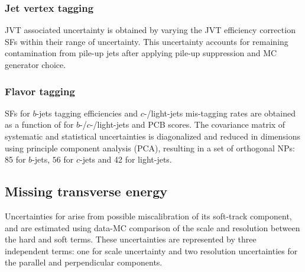 \documentclass[../thesis.tex]{subfiles}
\begin{document}
\subsubsection*{Jet vertex tagging}
JVT associated uncertainty is obtained by varying the JVT efficiency correction SFs within their range of uncertainty. This uncertainty accounts for remaining contamination from pile-up jets after applying pile-up suppression and MC generator choice.

\subsubsection*{Flavor tagging}
SFs for $b$-jets tagging efficiencies and $c$-/light-jets mis-tagging rates are obtained as a function of \pT for $b$-/$c$-/light-jets and PCB scores. The covariance matrix of systematic and statistical uncertainties is diagonalized and reduced in dimensions using principle component analysis (PCA), resulting in a set of orthogonal NPs: 85 for $b$-jets, $56$ for $c$-jets and 42 for light-jets.

\subsection{Missing transverse energy}
Uncertainties for \ETmiss arise from possible miscalibration of its soft-track component, and are estimated using data-MC comparison of the \pT scale and resolution between the hard and soft \ETmiss terms. These uncertainties are represented by three independent terms: one for scale uncertainty and two resolution uncertainties for the parallel and perpendicular components.
\end{document}
